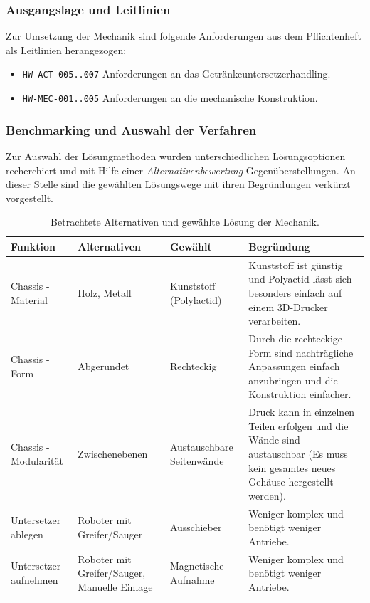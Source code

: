 \subsubsection*{Ausgangslage und Leitlinien}
Zur Umsetzung der Mechanik sind folgende Anforderungen aus dem Pflichtenheft als Leitlinien herangezogen:
\begin{itemize}
    \item \texttt{HW-ACT-005..007}  Anforderungen an das Getränkeuntersetzerhandling.
    \item \texttt{HW-MEC-001..005}  Anforderungen an die mechanische Konstruktion.
\end{itemize}

\subsubsection*{Benchmarking und Auswahl der Verfahren}
Zur Auswahl der Lösungmethoden wurden unterschiedlichen Lösungsoptionen recherchiert und mit Hilfe einer \textit{Alternativenbewertung} Gegenüberstellungen. 
An dieser Stelle sind die gewählten Lösungswege mit ihren Begründungen verkürzt vorgestellt.

\begin{table}[H]
\centering
\footnotesize
\caption{Betrachtete Alternativen und gewählte Lösung der Mechanik.}
\label{tab:mechanik-auswahl}
\begin{tabularx}{\textwidth}{@{}>{\raggedright\arraybackslash}p{2.6cm}>{\raggedright\arraybackslash}p{3.1cm}>{\raggedright\arraybackslash}p{2.3cm}X@{}}
\toprule
\textbf{Funktion} & \textbf{Alternativen} & \textbf{Gewählt} & \textbf{Begründung}\\
\midrule
Chassis - Material & Holz, Metall & Kunststoff (Polylactid) &
Kunststoff ist günstig und Polyactid lässt sich besonders einfach auf einem 3D-Drucker verarbeiten.\\
\midrule
Chassis - Form & Abgerundet & Rechteckig &
Durch die rechteckige Form sind nachträgliche Anpassungen einfach anzubringen und die Konstruktion einfacher.\\
\midrule
Chassis - Modularität & Zwischenebenen & Austauschbare Seitenwände &
Druck kann in einzelnen Teilen erfolgen und die Wände sind austauschbar (Es muss kein gesamtes neues Gehäuse hergestellt werden).\\
\midrule
Untersetzer ablegen & Roboter mit Greifer/Sauger & Ausschieber &
Weniger komplex und benötigt weniger Antriebe.\\
\midrule
Untersetzer aufnehmen & Roboter mit Greifer/Sauger, Manuelle Einlage & Magnetische Aufnahme &
Weniger komplex und benötigt weniger Antriebe.\\
\bottomrule
\end{tabularx}
\end{table}

